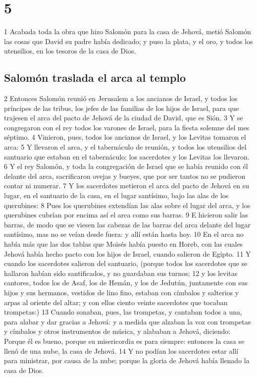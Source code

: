 \chapter{5}

1 Acabada toda la obra que hizo Salomón para la casa de Jehová, metió Salomón las cosas que David su padre había dedicado; y puso la plata, y el oro, y todos los utensilios, en los tesoros de la casa de Dios.

\section*{Salomón traslada el arca al templo}

2 Entonces Salomón reunió en Jerusalem a los ancianos de Israel, y todos los príncipes de las tribus, los jefes de las familias de los hijos de Israel, para que trajesen el arca del pacto de Jehová de la ciudad de David, que es Sión.
3 Y se congregaron con el rey todos los varones de Israel, para la fiesta solemne del mes séptimo.
4 Vinieron, pues, todos los ancianos de Israel, y los Levitas tomaron el arca:
5 Y llevaron el arca, y el tabernáculo de reunión, y todos los utensilios del santuario que estaban en el tabernáculo: los sacerdotes y los Levitas los llevaron.
6 Y el rey Salomón, y toda la congregación de Israel que se había  reunido con él delante del arca, sacrificaron ovejas y bueyes, que por ser tantos no se pudieron contar ni numerar.
7 Y los sacerdotes metieron el arca del pacto de Jehová en su lugar, en el santuario de la casa, en el lugar santísimo, bajo las alas de los querubines:
8 Pues los querubines extendían las alas sobre el lugar del arca, y los querubines cubrían por encima así el arca como sus barras.
9 E hicieron salir las barras, de modo que se viesen las cabezas de las barras del arca delante del lugar santísimo, mas no se veían desde fuera: y allí están hasta hoy.
10 En el arca no había más que las dos tablas que Moisés había puesto en Horeb, con las cuales Jehová había hecho pacto con los hijos de Israel, cuando salieron de Egipto.
11 Y cuando los sacerdotes salieron del santuario, (porque todos los sacerdotes que se hallaron habían sido santificados, y no guardaban sus turnos;
12 y los levitas cantores, todos los de Asaf, los de Hemán, y los de Jedutún, juntamente con sus hijos y sus hermanos, vestidos de lino fino, estaban con címbalos y salterios y arpas al oriente del altar; y con ellos ciento veinte sacerdotes que tocaban trompetas:)
13 Cuando sonaban, pues, las trompetas, y cantaban todos  a  una, para alabar y dar gracias  a  Jehová: y a medida que alzaban la voz con trompetas y címbalos y otros instrumentos de música, y alababan  a  Jehová, diciendo: Porque él es bueno, porque su misericordia es para siempre: entonces la casa se llenó de una nube, la casa de Jehová.
14 Y no podían los sacerdotes estar allí para ministrar, por causa de la nube; porque la gloria de Jehová había llenado la casa de Dios. 

